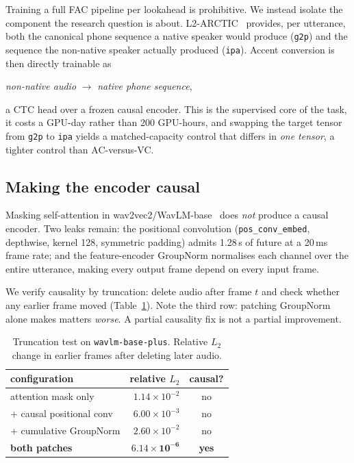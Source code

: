\documentclass[9pt,a4paper,twocolumn]{article}
\begin{document}
Training a full FAC pipeline per lookahead is prohibitive. We instead isolate
the component the research question is about. L2-ARCTIC~\cite{l2arctic2018}
provides, per utterance, both the canonical phone sequence a native speaker
would produce (\texttt{g2p}) and the sequence the non-native speaker actually
produced (\texttt{ipa}). Accent conversion is then directly trainable as
\begin{center}
\emph{non-native audio} $\rightarrow$ \emph{native phone sequence},
\end{center}
a CTC head over a frozen causal encoder. This is the supervised core of the
task, it costs a GPU-day rather than 200 GPU-hours, and swapping the target
tensor from \texttt{g2p} to \texttt{ipa} yields a matched-capacity control that
differs in \emph{one tensor}, a tighter control than AC-versus-VC.

\subsection{Making the encoder causal}
\label{sec:causal}

Masking self-attention in wav2vec2/WavLM-base~\cite{wavlm2022, wav2vec2} does
\emph{not} produce a causal encoder. Two leaks remain: the positional
convolution (\texttt{pos\_conv\_embed}, depthwise, kernel 128, symmetric
padding) admits 1.28\,s of future at a 20\,ms frame rate; and the
feature-encoder GroupNorm normalises each channel over the entire utterance,
making every output frame depend on every input frame.

We verify causality by truncation: delete audio after frame $t$ and check
whether any earlier frame moved (Table~\ref{tab:causal}). Note the third row:
patching GroupNorm alone makes matters \emph{worse}. A partial causality fix is
not a partial improvement.

\begin{table}[t]
\centering\small
\caption{Truncation test on \texttt{wavlm-base-plus}. Relative $L_2$ change in
earlier frames after deleting later audio.}
\label{tab:causal}
\begin{tabular}{lrc}
\toprule
configuration & relative $L_2$ & causal? \\
\midrule
attention mask only        & $1.14\times10^{-2}$ & no \\
\quad + causal positional conv & $6.00\times10^{-3}$ & no \\
\quad + cumulative GroupNorm   & $2.60\times10^{-2}$ & no \\
\textbf{both patches}      & $\mathbf{6.14\times10^{-6}}$ & \textbf{yes} \\
\bottomrule
\end{tabular}
\end{table}
\end{document}
